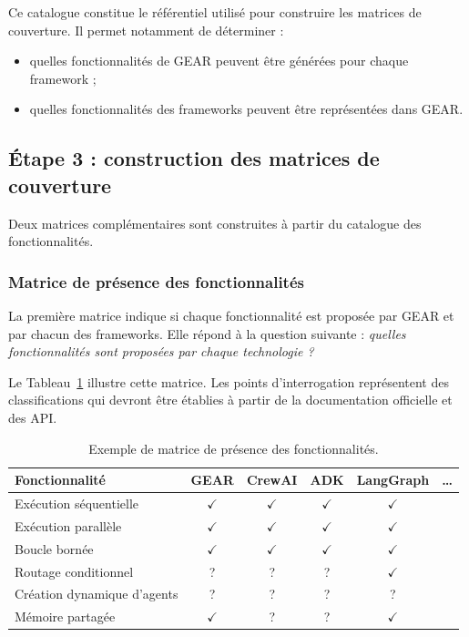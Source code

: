 Ce catalogue constitue le référentiel utilisé pour construire les
matrices de couverture. Il permet notamment de déterminer :

\begin{itemize}
    \item quelles fonctionnalités de GEAR peuvent être générées pour
    chaque framework ;
    \item quelles fonctionnalités des frameworks peuvent être
    représentées dans GEAR.
\end{itemize}


\subsection{Étape 3 : construction des matrices de couverture}
\label{subsec:matrices-couverture}

Deux matrices complémentaires sont construites à partir du catalogue
des fonctionnalités.

\subsubsection{Matrice de présence des fonctionnalités}

La première matrice indique si chaque fonctionnalité est proposée par
GEAR et par chacun des frameworks. Elle répond à la question suivante :
\emph{quelles fonctionnalités sont proposées par chaque technologie ?}

Le Tableau~\ref{tab:presence-fonctionnalites} illustre cette matrice.
Les points d'interrogation représentent des classifications qui devront
être établies à partir de la documentation officielle et des API.

\begin{table}[t]
    \centering
    \caption{Exemple de matrice de présence des fonctionnalités.}
    \label{tab:presence-fonctionnalites}
    \begin{tabularx}{\textwidth}{@{}>{\raggedright\arraybackslash}Xccccc@{}}
        \toprule
        \textbf{Fonctionnalité}
        & \textbf{GEAR}
        & \textbf{CrewAI}
        & \textbf{ADK}
        & \textbf{LangGraph}
        & \textbf{\ldots} \\
        \midrule
        Exécution séquentielle
            & $\checkmark$ & $\checkmark$ & $\checkmark$
            & $\checkmark$ & \\
        Exécution parallèle
            & $\checkmark$ & $\checkmark$ & $\checkmark$
            & $\checkmark$ & \\
        Boucle bornée
            & $\checkmark$ & $\checkmark$ & $\checkmark$
            & $\checkmark$ & \\
        Routage conditionnel
            & ? & ? & ? & $\checkmark$ & \\
        Création dynamique d'agents
            & ? & ? & ? & ? & \\
        Mémoire partagée
            & $\checkmark$ & ? & ? & $\checkmark$ & \\
        \bottomrule
    \end{tabularx}
\end{table}


